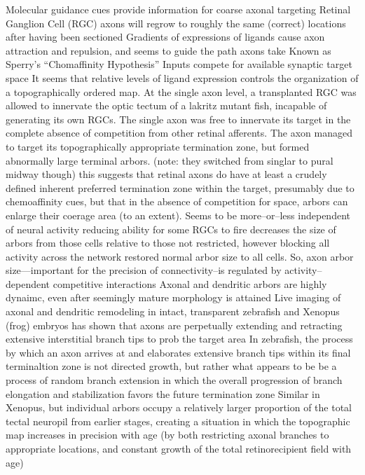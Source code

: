 \documentclass[11pt, a4paper, oneside]{article}   	%
\begin{document}
\begin{outline}
 \point Molecular guidance cues provide information for coarse axonal targeting 
    \subpoint Retinal Ganglion Cell (RGC) axons will regrow to roughly the same (correct) locations after having been sectioned
    \subpoint Gradients of expressions of ligands cause axon attraction and repulsion, and seems to guide the path axons take
        \subsubpoint Known as Sperry's ``Chomaffinity Hypothesis''
 \point Inputs compete for available synaptic target space
    \subpoint It seems that relative levels of ligand expression controls the organization of a topographically ordered map.
    \subpoint At the single axon level, a transplanted RGC was allowed to innervate the optic tectum of a lakritz mutant fish, incapable of generating its own RGCs. The single axon was free to innervate its target in the complete absence of competition from other retinal afferents. The axon managed to target its topographically appropriate termination zone, but formed abnormally large terminal arbors. (note: they switched from singlar to pural midway though)
        \subsubpoint this suggests that retinal axons do have at least a crudely defined inherent preferred termination zone within the target, presumably due to chemoaffinity cues, but that in the absence of competition for space, arbors can enlarge their coerage area (to an extent).
    \subpoint Seems to be more--or--less independent of neural activity 
        \subsubpoint reducing ability for some RGCs to fire decreases the size of arbors from those cells relative to those not restricted, however blocking all activity across the network restored normal arbor size to all cells.
            \supersubpoint So, axon arbor size---important for the precision of connectivity--is regulated by activity--dependent competitive interactions
 \point Axonal and dendritic arbors are highly dynaimc, even after seemingly mature morphology is attained
    \subpoint Live imaging of axonal and dendritic remodeling in intact, transparent zebrafish and Xenopus (frog) embryos has shown that axons are perpetually extending and retracting extensive interstitial branch tips to prob the target area
    \subpoint In zebrafish, the process by which an axon arrives at and elaborates extensive branch tips within its final terminaltion zone is not directed growth, but rather what appears to be be a process of random branch extension in which the overall progression of branch elongation and stabilization favors the future termination zone
    \subpoint Similar in Xenopus, but individual arbors occupy a relatively larger proportion of the total tectal neuropil from earlier stages, creating a situation in which the topographic map increases in precision with age (by both restricting axonal branches to appropriate locations, and constant growth of the total retinorecipient field with age)

\end{outline}
\end{document}
